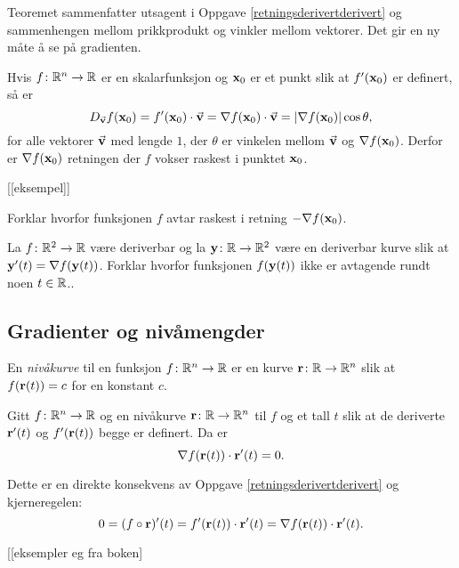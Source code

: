 Teoremet sammenfatter utsagent i Oppgave \ref{retningsderivertderivert}
og sammenhengen mellom prikkprodukt og vinkler mellom vektorer. Det gir en ny
måte å se på gradienten. 
\begin{teorem}
  Hvis $f\colon \mathbb{R}^n \to \mathbb{R}$ er en skalarfunksjon og $\mathbf{x}_0$ er et punkt slik
  at $f'(\mathbf{x}_0)$ er definert, så er
  $$D_{\vec{\mathbf{v}}} f(\mathbf{x}_0) = f'(\mathbf{x}_0) \cdot \vec{\mathbf{v}} = \nabla f(\mathbf{x}_0) \cdot
  \vec{\mathbf{v}} = |\nabla f(\mathbf{x}_0)| \cos \theta,$$
  for alle vektorer $\vec{\mathbf{v}}$ med lengde $1$, der $\theta$ er vinkelen mellom $\vec{\mathbf{v}}$ og $\nabla f(\mathbf{x}_0)$.
  Derfor er $\nabla f(\mathbf{x}_0)$ retningen der $f$ vokser raskest i punktet $\mathbf{x}_0$.
\end{teorem}
[[eksempel]]

\begin{oppgave}
  Forklar hvorfor funksjonen $f$ avtar raskest i retning $-\nabla f(\mathbf{x}_0)$.
\end{oppgave}
\begin{oppgave}
  La $f \colon \mathbb{R}^2 \to \mathbb{R}$ være deriverbar og la $\mathbf{y} \colon \mathbb{R} \to \mathbb{R}^2$ være en deriverbar kurve slik at 
  $\mathbf{y}'(t) = \nabla f(\mathbf{y}(t))$. Forklar hvorfor funksjonen $f(\mathbf{y}(t))$ ikke er avtagende rundt noen $t \in \mathbb{R}$..
\end{oppgave}



\subsection{Gradienter og nivåmengder}

\begin{definisjon}
  En {\em nivåkurve} til en funksjon $f \colon \mathbb{R}^n \to \mathbb{R}$ er en kurve
  $\mathbf{r} \colon \mathbb{R} \to \mathbb{R}^n$
  slik at $f(\mathbf{r}(t)) = c$ for en konstant $c$.
\end{definisjon}
\begin{teorem}
  Gitt $f \colon \mathbb{R}^n \to \mathbb{R}$ og en nivåkurve $\mathbf{r} \colon \mathbb{R} \to \mathbb{R}^n$
  til $f$ og et tall $t$ slik at de deriverte  $\mathbf{r}'(t)$ og $f'(\mathbf{r}(t))$
  begge er definert. Da er 
  $$\nabla f(\mathbf{r}(t)) \cdot \mathbf{r}'(t) = 0.$$
\end{teorem}
Dette er en direkte konsekvens av Oppgave \ref{retningsderivertderivert} og kjerneregelen:
\begin{displaymath}
  0 = (f \circ \mathbf{r})'(t) =
  f'(\mathbf{r}(t)) \cdot \mathbf{r}'(t) =
  \nabla f(\mathbf{r}(t)) \cdot \mathbf{r}'(t).
\end{displaymath}

[[eksempler eg fra boken]


